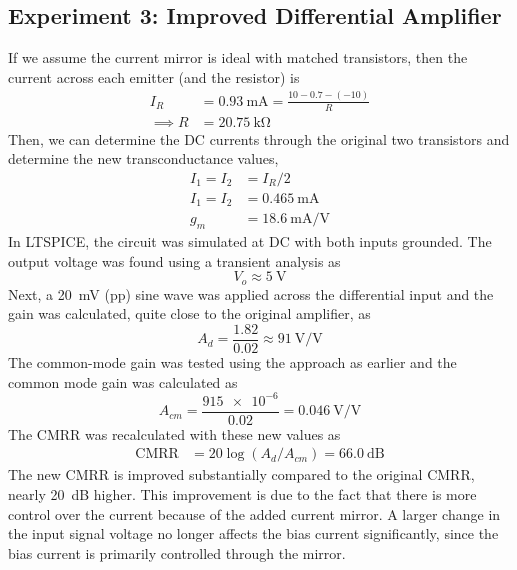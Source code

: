 \documentclass{homework}
\begin{document}
	\subsection*{Experiment 3: Improved Differential Amplifier}
	If we assume the current mirror is ideal with matched transistors, then the current across each emitter (and the resistor) is \begin{align*}
		I_R & = \SI{0.93}{\mA} = \frac{10 - 0.7 - (-10)}{R} \\
		\implies R & = \SI{20.75}{\kohm}
	\end{align*}
	Then, we can determine the DC currents through the original two transistors and determine the new transconductance values, \begin{align*}
		I_1 = I_2 & = I_R / 2 \\
		I_1 = I_2 & = \SI{0.465}{\mA} \\
		g_m & = \SI{18.6}{\mA/\V}
	\end{align*}
	In LTSPICE, the circuit was simulated at DC with both inputs grounded. The output voltage was found using a transient analysis as 
	\[ V_o \approx \SI{5}{\V} \]
	Next, a \SI{20}{\mV} (pp) sine wave was applied across the differential input and the gain was calculated, quite close to the original amplifier, as
	\[ A_d = \frac{1.82}{0.02} \approx \SI{91}{\V/\V}  \]
	The common-mode gain was tested using the approach as earlier and the common mode gain was calculated as
	\[ A_{cm} = \frac{\num{915e-6}}{0.02} = \SI{0.046}{\V/\V} \]
	The CMRR was recalculated with these new values as \begin{align*}
		\mathrm{CMRR} & = 20 \log(A_d / A_{cm}) = \SI{66.0}{\dB} 
	\end{align*}
	The new CMRR is improved substantially compared to the original CMRR, nearly \SI{20}{\dB} higher. This improvement is due to the fact that there is more control over the current because of the added current mirror. A larger change in the input signal voltage no longer affects the bias current significantly, since the bias current is primarily controlled through the mirror. 
\end{document}

